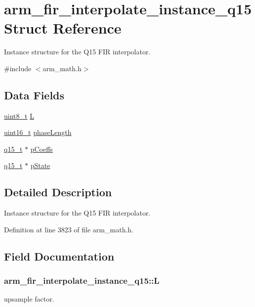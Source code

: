 \hypertarget{structarm__fir__interpolate__instance__q15}{\section{arm\-\_\-fir\-\_\-interpolate\-\_\-instance\-\_\-q15 Struct Reference}
\label{structarm__fir__interpolate__instance__q15}
}


Instance structure for the Q15 F\-I\-R interpolator.  




{\ttfamily \#include $<$arm\-\_\-math.\-h$>$}

\subsection*{Data Fields}
\begin{DoxyCompactItemize}
\item 
\hyperlink{stdint_8h_aba7bc1797add20fe3efdf37ced1182c5}{uint8\-\_\-t} \hyperlink{structarm__fir__interpolate__instance__q15_a5431bdc079e72a973b51d359f7f13603}{L}
\item 
\hyperlink{stdint_8h_a273cf69d639a59973b6019625df33e30}{uint16\-\_\-t} \hyperlink{structarm__fir__interpolate__instance__q15_ad5178a02a697a77e0d0e60705d9f0a19}{phase\-Length}
\item 
\hyperlink{arm__math_8h_ab5a8fb21a5b3b983d5f54f31614052ea}{q15\-\_\-t} $\ast$ \hyperlink{structarm__fir__interpolate__instance__q15_a767d91d61d4c0beeddd4325d28d28e24}{p\-Coeffs}
\item 
\hyperlink{arm__math_8h_ab5a8fb21a5b3b983d5f54f31614052ea}{q15\-\_\-t} $\ast$ \hyperlink{structarm__fir__interpolate__instance__q15_a26b864363fa47954248f2590e3a82a3c}{p\-State}
\end{DoxyCompactItemize}


\subsection{Detailed Description}
Instance structure for the Q15 F\-I\-R interpolator. 

Definition at line 3823 of file arm\-\_\-math.\-h.



\subsection{Field Documentation}
\hypertarget{structarm__fir__interpolate__instance__q15_a5431bdc079e72a973b51d359f7f13603}{
\subsubsection[{L}]{ arm\-\_\-fir\-\_\-interpolate\-\_\-instance\-\_\-q15\-::\-L}}\label{structarm__fir__interpolate__instance__q15_a5431bdc079e72a973b51d359f7f13603}
upsample factor. 

